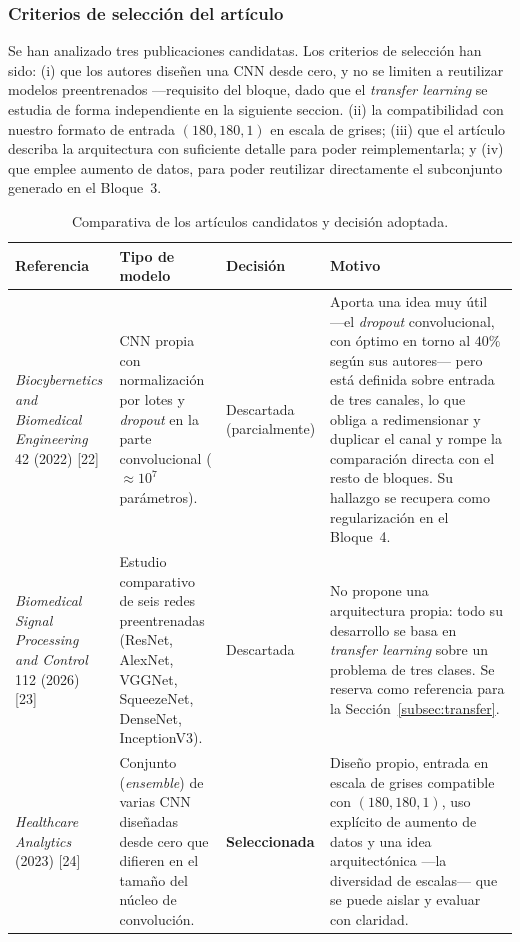 \documentclass[11pt, a4paper]{article}
\numberwithin{equation}{section}
\begin{document}
\subsubsection{Criterios de selección del artículo}

Se han analizado tres publicaciones candidatas. Los criterios de selección han sido:
(i) que los autores diseñen una CNN desde cero, y no se limiten a reutilizar
modelos preentrenados ---requisito del bloque, dado que el \textit{transfer learning}
se estudia de forma independiente en la siguiente seccion.
(ii) la compatibilidad con nuestro formato de entrada $(180, 180, 1)$ en escala de grises;
(iii) que el artículo describa la arquitectura con suficiente detalle para poder
reimplementarla; y (iv) que emplee aumento de datos, para poder reutilizar directamente
el subconjunto generado en el Bloque~3.

\begin{table}[H]
\centering
\caption{Comparativa de los artículos candidatos y decisión adoptada.}
\label{tab:seleccion_papers}
\footnotesize
\renewcommand{\arraystretch}{1.15}
\begin{tabular}{p{3.1cm} p{3.4cm} p{2.6cm} p{5.4cm}}
\hline
\textbf{Referencia} & \textbf{Tipo de modelo} & \textbf{Decisión} & \textbf{Motivo} \\
\hline
\textit{Biocybernetics and Biomedical Engineering} 42 (2022) [22] &
CNN propia con normalización por lotes y \textit{dropout} en la parte convolucional ($\approx 10^{7}$ parámetros). &
Descartada (parcialmente) &
Aporta una idea muy útil ---el \textit{dropout} convolucional, con óptimo en torno al $40\%$ según sus autores--- pero está definida sobre entrada de tres canales, lo que obliga a redimensionar y duplicar el canal y rompe la comparación directa con el resto de bloques. Su hallazgo se recupera como regularización en el Bloque~4. \\
\textit{Biomedical Signal Processing and Control} 112 (2026) [23] &
Estudio comparativo de seis redes preentrenadas (ResNet, AlexNet, VGGNet, SqueezeNet, DenseNet, InceptionV3). &
Descartada &
No propone una arquitectura propia: todo su desarrollo se basa en \textit{transfer learning} sobre un problema de tres clases. Se reserva como referencia para la Sección~\ref{subsec:transfer}. \\
\textit{Healthcare Analytics} (2023) [24] &
Conjunto (\textit{ensemble}) de varias CNN diseñadas desde cero que difieren en el tamaño del núcleo de convolución. &
\textbf{Seleccionada} &
Diseño propio, entrada en escala de grises compatible con $(180,180,1)$, uso explícito de aumento de datos y una idea arquitectónica ---la diversidad de escalas--- que se puede aislar y evaluar con claridad. \\
\hline
\end{tabular}
\end{table}
\end{document}
